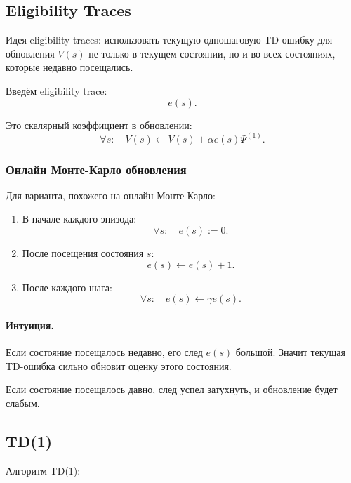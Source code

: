 \documentclass[12pt,a4paper]{article}
\begin{document}
\subsection{Eligibility Traces}

Идея eligibility traces: использовать текущую одношаговую TD-ошибку для обновления $V(s)$ не только в текущем состоянии, но и во всех состояниях, которые недавно посещались.

Введём eligibility trace:
\[
e(s).
\]

Это скалярный коэффициент в обновлении:
\[
\forall s:
\quad
V(s)
\leftarrow
V(s)
+
\alpha
e(s)
\Psi^{(1)}.
\]

\subsubsection{Онлайн Монте-Карло обновления}

Для варианта, похожего на онлайн Монте-Карло:

\begin{enumerate}
    \item В начале каждого эпизода:
    \[
    \forall s:\quad e(s):=0.
    \]

    \item После посещения состояния $s$:
    \[
    e(s)\leftarrow e(s)+1.
    \]

    \item После каждого шага:
    \[
    \forall s:\quad e(s)\leftarrow \gamma e(s).
    \]
\end{enumerate}

\paragraph{Интуиция.}

Если состояние посещалось недавно, его след $e(s)$ большой. Значит текущая TD-ошибка сильно обновит оценку этого состояния.

Если состояние посещалось давно, след успел затухнуть, и обновление будет слабым.

\subsection{TD(1)}

Алгоритм TD(1):
\end{document}
